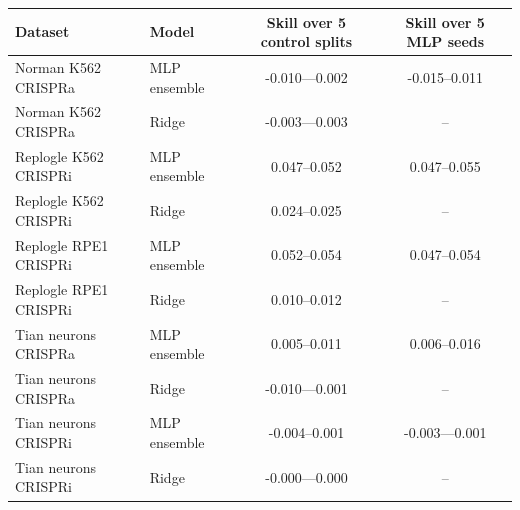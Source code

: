 \begin{tabular}{llcc}
\toprule
Dataset & Model & Skill over 5 control splits & Skill over 5 MLP seeds \\
\midrule
Norman K562 CRISPRa & MLP ensemble & -0.010---0.002 & -0.015--0.011 \\
Norman K562 CRISPRa & Ridge & -0.003---0.003 & -- \\
Replogle K562 CRISPRi & MLP ensemble & 0.047--0.052 & 0.047--0.055 \\
Replogle K562 CRISPRi & Ridge & 0.024--0.025 & -- \\
Replogle RPE1 CRISPRi & MLP ensemble & 0.052--0.054 & 0.047--0.054 \\
Replogle RPE1 CRISPRi & Ridge & 0.010--0.012 & -- \\
Tian neurons CRISPRa & MLP ensemble & 0.005--0.011 & 0.006--0.016 \\
Tian neurons CRISPRa & Ridge & -0.010---0.001 & -- \\
Tian neurons CRISPRi & MLP ensemble & -0.004--0.001 & -0.003---0.001 \\
Tian neurons CRISPRi & Ridge & -0.000---0.000 & -- \\
\bottomrule
\end{tabular}